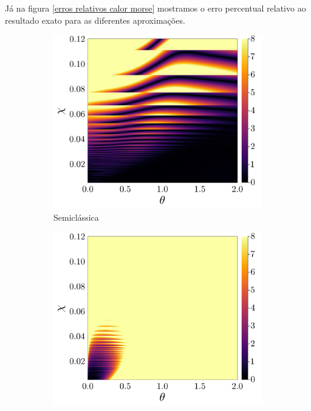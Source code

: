 \documentclass[
	12pt,
	oneside,			%
	a4paper,			%
	english,			%
	brazil				%
	]{abntex2}
\theoremstyle{definition}
\begin{document}
Já na figura \eqref{erros relativos calor morse} mostramos o erro percentual relativo ao resultado exato para as diferentes aproximações.

\begin{figure}[H]
     \centering
     \begin{subfigure}[b]{0.32\textwidth}
         \centering
         \includegraphics[width=\textwidth]{Imagens/erro_calor_sc_morse.png}
         \caption{Semiclássica}
         \label{erro relativo calor morse sc}
     \end{subfigure}
     \hfill
     \begin{subfigure}[b]{0.32\textwidth}
         \centering
         \includegraphics[width=\textwidth]{Imagens/erro_calor_dm_morse.png}

\end{subfigure}
\end{figure}
\end{document}
